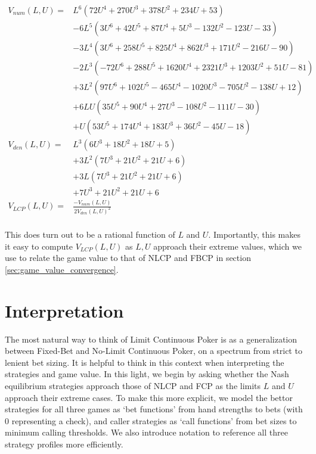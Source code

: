 \documentclass[a4paper,12pt]{article}
\theoremstyle{plain}
\theoremstyle{definition}
\begin{document}
\begin{align*}
    V_{num}(L, U) =& L^6 \left(72 U^4+270 U^3+378 U^2+234 U+53\right) \\
        & -6 L^5 \left(3 U^6+42 U^5+87U^4+5 U^3-132 U^2-123 U-33\right)\\
        & -3 L^4 \left(3 U^6+258 U^5+825 U^4+862 U^3+171U^2-216 U-90\right) \\ 
        &-2 L^3 \left(-72 U^6+288 U^5+1620 U^4+2321 U^3+1203 U^2+51U-81\right) \\
        & +3 L^2 \left(97 U^6+102 U^5-465 U^4-1020 U^3-705 U^2-138 U+12\right) \\
        & +6 LU \left(35 U^5+90 U^4+27 U^3-108 U^2-111 U-30\right) \\ 
        & +U \left(53 U^5+174 U^4+183U^3+36 U^2-45 U-18\right)\\
    V_{den}(L, U) =& L^3 \left(6 U^3+18 U^2+18 U+5\right)\\
        &+3 L^2\left(7 U^3+21 U^2+21 U+6\right)\\
        &+3 L \left(7 U^3+21 U^2+21 U+6\right)\\
        &+7 U^3+21U^2+21 U+6 \\
    V_{LCP}(L, U) =& \frac{-V_{num}(L, U)}{2 V_{den}(L, U)^2}\\
\end{align*}

This does turn out to be a rational function of $L$ and $U$. Importantly, this makes it easy to compute $V_{LCP}(L, U)$ as $L, U$ approach their extreme values, which we use to relate the game value to that of NLCP and FBCP in section \ref{sec:game_value_convergence}.

\section{Interpretation}
The most natural way to think of Limit Continuous Poker is as a generalization between Fixed-Bet and No-Limit Continuous Poker, on a spectrum from strict to lenient bet sizing. It is helpful to think in this context when interpreting the strategies and game value. In this light, we begin by asking whether the Nash equilibrium strategies approach those of NLCP and FCP as the limits $L$ and $U$ approach their extreme cases. To make this more explicit, we model the bettor strategies for all three games as `bet functions’ from hand strengths to bets (with 0 representing a check), and caller strategies as `call functions’ from bet sizes to minimum calling thresholds. We also introduce notation to reference all three strategy profiles more efficiently.
\end{document}
